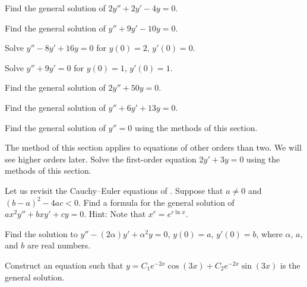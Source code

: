 \begin{exercise}
Find the general solution of $2y'' + 2y' -4 y = 0$.
\end{exercise}

\begin{exercise}
Find the general solution of $y'' + 9y' - 10 y = 0$.
\end{exercise}

\begin{exercise}
Solve $y'' - 8y' + 16 y = 0$ for $y(0) = 2$, $y'(0) = 0$.
\end{exercise}

\begin{exercise}
Solve $y'' + 9y' = 0$ for $y(0) = 1$, $y'(0) = 1$.
\end{exercise}

\begin{exercise}
Find the general solution of $2y'' + 50y = 0$.
\end{exercise}

\begin{exercise}
Find the general solution of $y'' + 6 y' + 13 y = 0$.
\end{exercise}

\begin{exercise}
Find the general solution of $y'' = 0$ using the methods of this section.
\end{exercise}

\begin{exercise}
The method of this section applies to equations of other orders than two.
We will see higher orders later.
Solve the first-order equation
$2y' + 3y = 0$ using the methods of this section.
\end{exercise}

\begin{exercise}
Let us revisit the Cauchy--Euler equations of
.  Suppose
that $a \neq 0$ and ${(b-a)}^2-4ac < 0$.  Find a formula for the general solution
of $a x^2 y'' + b x y' + c y = 0$.  Hint: Note that $x^r = e^{r \ln x}$.
\end{exercise}

\begin{exercise}
Find the solution to
$y''-(2\alpha) y' + \alpha^2 y=0$, $y(0) = a$, $y'(0)=b$,
where $\alpha$, $a$, and $b$ are real numbers.
\end{exercise}

\begin{exercise}
Construct an equation such that $y = C_1 e^{-2x} \cos(3x) + C_2 e^{-2x}
\sin(3x)$ is the general
solution.
\end{exercise}


